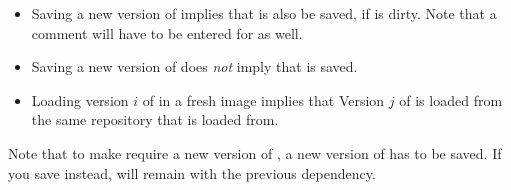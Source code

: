 \documentclass[a4paper,10pt,twoside]{book}
\begin{document}
\begin{itemize}
\item Saving a new version of  implies that  is also be saved, if  is dirty. Note that a comment will have to be entered for  as well.
\item Saving a new version of  does \emph{not} imply that  is saved.
\item Loading version $i$ of  in a fresh image implies that Version $j$ of  is loaded from the same repository that  is loaded from.  
\end{itemize}

Note that to make  require a new version of , a new version of  has to be saved. If you save  instead,  will remain with the previous dependency.





\end{document}
